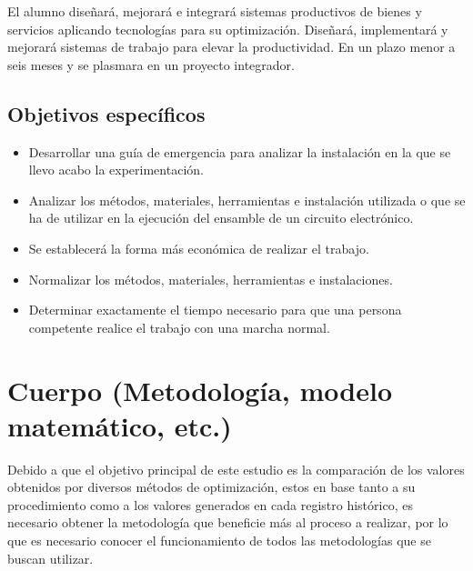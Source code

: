 El alumno diseñará, mejorará e integrará sistemas productivos de bienes y servicios aplicando tecnologías para su optimización.
Diseñará, implementará y mejorará sistemas de trabajo para elevar la productividad.
En un plazo menor a seis meses y se plasmara en un proyecto integrador.
    
    \subsection{Objetivos específicos }
    
    \begin{itemize}
    \item Desarrollar una guía de emergencia para analizar la instalación en la que se llevo acabo la experimentación.
    \item Analizar los métodos, materiales, herramientas e instalación utilizada o que se ha de utilizar en la ejecución del ensamble de un circuito electrónico.
    \item Se establecerá la forma más económica de realizar el trabajo.
    \item Normalizar los métodos, materiales, herramientas e instalaciones.
    \item Determinar exactamente el tiempo necesario para que una persona competente realice el trabajo con una marcha normal.
    \end{itemize}
    
    \section{Cuerpo (Metodología, modelo matemático, etc.)}
    
    
        Debido a que el objetivo principal de este estudio es la comparación de los valores obtenidos por diversos métodos de optimización, estos en base tanto a su procedimiento como a los valores generados en cada registro histórico, es necesario obtener la metodología que beneficie más al proceso a realizar, por lo que es necesario conocer el funcionamiento de todos las metodologías que se buscan utilizar. 
        
